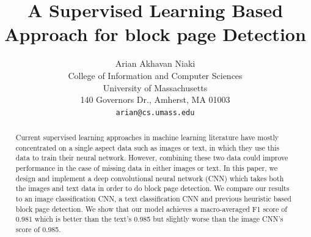 \documentclass{article} %
\title{A Supervised Learning Based Approach for block page Detection}
\author{
Arian Akhavan Niaki\\
College of Information and Computer Sciences\\
University of Massachusetts\\
140 Governors Dr., Amherst, MA 01003 \\
\texttt{arian@cs.umass.edu} \\
}
\begin{document}
\maketitle

\begin{abstract}
Current supervised learning approaches in machine learning literature have mostly concentrated on a single aspect data such as images or text, in which they use this data to train their neural network. However, combining these two data could improve performance in the case of missing data in either images or text. In this paper, we design and implement a deep convolutional neural network (CNN) which takes both the images and text data in order to do block page detection. We compare our results to an image classification CNN, a text classification CNN and previous heuristic based block page detection. We show that our model achieves a macro-averaged F1 score of 0.981 which is better than the text's 0.985 but slightly worse than the image CNN's score of 0.985.
\end{abstract}
\end{document}
